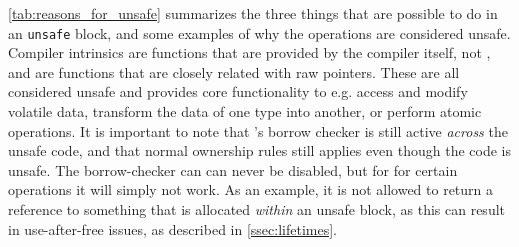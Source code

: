 \autoref{tab:reasons_for_unsafe} summarizes the three things that are possible to do in an \texttt{unsafe} block, and some examples of why the operations are considered unsafe.
Compiler intrinsics are functions that are provided by the compiler itself, not \rust, and are functions that are closely related with raw pointers.
These are all considered unsafe and provides core functionality to e.g. access and modify volatile data, transform the data of one type into another, or perform atomic operations.
It is important to note that \rust's borrow checker is still active \emph{across} the unsafe code, and that normal ownership rules still applies even though the code is unsafe.
The borrow-checker can can never be disabled, but for for certain operations it will simply not work.
As an example, it is not allowed to return a reference to something that is allocated \emph{within} an unsafe block, as this can result in use-after-free issues, as described in \autoref{ssec:lifetimes}.
